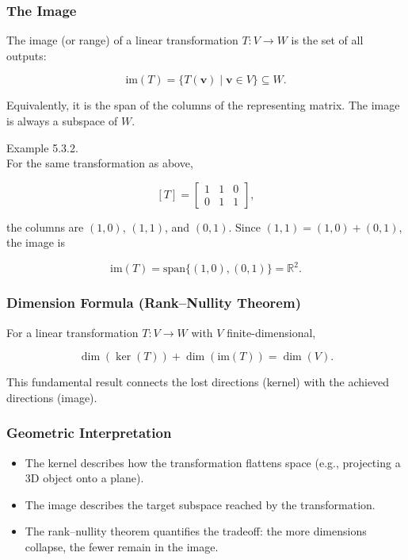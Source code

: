 \documentclass[
  12pt,
  a4paper,
]{article}
\begin{document}
\subsubsection{The Image}\label{the-image}

The image (or range) of a linear transformation \(T: V \to W\) is the
set of all outputs:

\[\text{im}(T) = \{ T(\mathbf{v}) \mid \mathbf{v} \in V \} \subseteq W.\]

Equivalently, it is the span of the columns of the representing matrix.
The image is always a subspace of \(W\).

Example 5.3.2.\\
For the same transformation as above,

\[[T] = \begin{bmatrix}
1 & 1 & 0 \\
0 & 1 & 1
\end{bmatrix},\]

the columns are \((1,0)\), \((1,1)\), and \((0,1)\). Since
\((1,1) = (1,0) + (0,1)\), the image is

\[\text{im}(T) = \text{span}\{ (1,0), (0,1) \} = \mathbb{R}^2.\]

\subsubsection{Dimension Formula (Rank--Nullity
Theorem)}\label{dimension-formula-rank--nullity-theorem}

For a linear transformation \(T: V \to W\) with \(V\)
finite-dimensional,

\[\dim(\ker(T)) + \dim(\text{im}(T)) = \dim(V).\]

This fundamental result connects the lost directions (kernel) with the
achieved directions (image).

\subsubsection{Geometric
Interpretation}\label{geometric-interpretation-10}

\begin{itemize}
\item
  The kernel describes how the transformation flattens space (e.g.,
  projecting a 3D object onto a plane).
\item
  The image describes the target subspace reached by the transformation.
\item
  The rank--nullity theorem quantifies the tradeoff: the more dimensions
  collapse, the fewer remain in the image.
\end{itemize}
\end{document}
